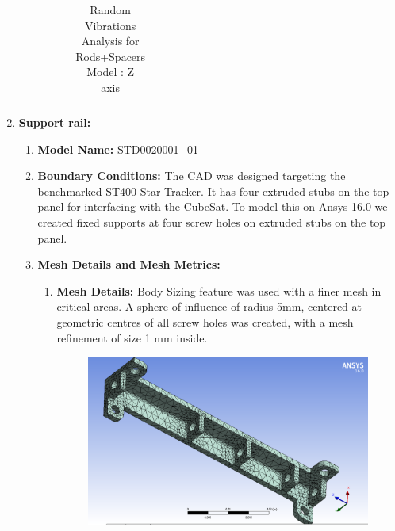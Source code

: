 \documentclass[../../main.tex]{subfiles}
\begin{document}
\begin{enumerate}
\begin{enumerate}
\begin{enumerate}
\begin{enumerate}
\begin{table}[h!]
\begin{tabular}{|p{8cm}|p{3cm}|}
                        \hline
                    \end{tabular}
                    \caption{Random Vibrations Analysis for Rods+Spacers Model : Z axis}
                    \label{tab:my_label}
                \end{table}
                \end{enumerate} 
            \end{enumerate}
        \end{enumerate}
        
        \newpage
        \item \textbf{Support rail:}
        \begin{enumerate}
            \item \textbf{Model Name: }STD0020001\_01
            \item \textbf{Boundary Conditions: }The CAD was designed targeting the benchmarked ST400 Star Tracker. It has four extruded stubs on the top panel for interfacing with the CubeSat. To model this on Ansys 16.0 we created fixed supports at four screw holes on extruded stubs on the top panel.
            \item \textbf{Mesh Details and Mesh Metrics:}
            \begin{enumerate}
                \item \textbf{Mesh Details:} Body Sizing feature was used with a finer mesh in critical areas. A sphere of influence of radius 5mm, centered at geometric centres of all screw holes was created, with a mesh refinement of size 1 mm inside.\newline
                \newline
                \newline
                \begin{figure}[H]
                    \centering
                    \includegraphics[scale=0.45]{Figures/Mechanical/Support Rail Mesh.PNG}

\end{figure}
\end{enumerate}
\end{enumerate}
\end{enumerate}
\end{document}
